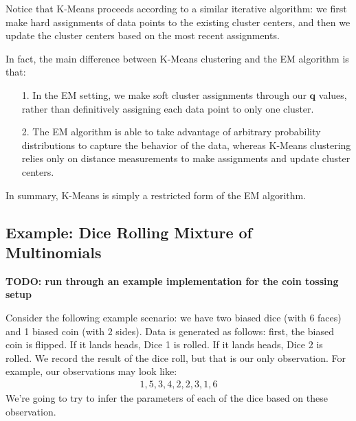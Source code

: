 Notice that K-Means proceeds according to a similar iterative algorithm: we first make hard assignments of data points to the existing cluster centers, and then we update the cluster centers based on the most recent assignments.

In fact, the main difference between K-Means clustering and the EM algorithm is that:

\begin{itemize}
    \item[1.] In the EM setting, we make soft cluster assignments through our $\textbf{q}$ values, rather than definitively assigning each data point to only one cluster.
    \item[2.] The EM algorithm is able to take advantage of arbitrary probability distributions to capture the behavior of the data, whereas K-Means clustering relies only on distance measurements to make assignments and update cluster centers.
\end{itemize}

In summary, K-Means is simply a restricted form of the EM algorithm.

\subsection{Example: Dice Rolling Mixture of Multinomials}
\textbf{TODO: run through an example implementation for the coin tossing setup}

Consider the following example scenario: we have two biased dice (with 6 faces) and 1 biased coin (with 2 sides). Data is generated as follows: first, the biased coin is flipped. If it lands heads, Dice 1 is rolled. If it lands heads, Dice 2 is rolled. We record the result of the dice roll, but that is our only observation. For example, our observations may look like:
\begin{align*}
    1, 5, 3, 4, 2, 2, 3, 1, 6
\end{align*}
We're going to try to infer the parameters of each of the dice based on these observation.

